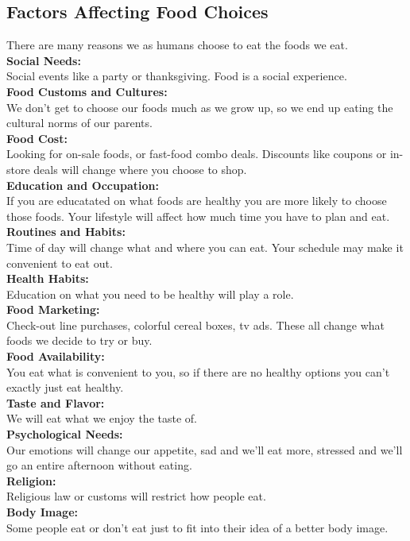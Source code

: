 \documentclass[letterpaper, 11pt]{article}
\begin{document}
\subsection{Factors Affecting Food Choices}
\label{sec:org6137ef1}
There are many reasons we as humans choose to eat the foods we eat. \\
\textbf{Social Needs:}\\
Social events like a party or thanksgiving. Food is a social experience.\\
\textbf{Food Customs and Cultures:}\\
We don't get to choose our foods much as we grow up, so we end up eating the cultural norms of our parents.\\
\textbf{Food Cost:}\\
Looking for on-sale foods, or fast-food combo deals. Discounts like coupons or in-store deals will change where you choose to shop.\\
\textbf{Education and Occupation:}\\
If you are educatated on what foods are healthy you are more likely to choose those foods. Your lifestyle will affect how much time you have to plan and eat.\\
\textbf{Routines and Habits:}\\
Time of day will change what and where you can eat. Your schedule may make it convenient to eat out.\\
\textbf{Health Habits:}\\
Education on what you need to be healthy will play a role.\\
\textbf{Food Marketing:}\\
Check-out line purchases, colorful cereal boxes, tv ads. These all change what foods we decide to try or buy.\\
\textbf{Food Availability:}\\
You eat what is convenient to you, so if there are no healthy options you can't exactly just eat healthy.\\
\textbf{Taste and Flavor:}\\
We will eat what we enjoy the taste of.\\
\textbf{Psychological Needs:}\\
Our emotions will change our appetite, sad and we'll eat more, stressed and we'll go an entire afternoon without eating.\\
\textbf{Religion:}\\
Religious law or customs will restrict how people eat.\\
\textbf{Body Image:}\\
Some people eat or don't eat just to fit into their idea of a better body image.\\
\end{document}
